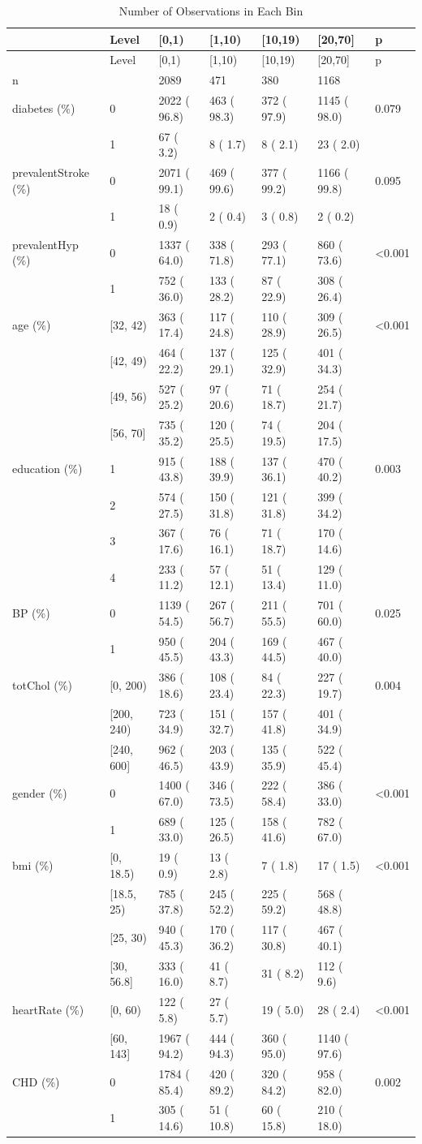 \documentclass[]{article}
\begin{document}
\begin{longtable}[]{@{}lllllll@{}}
\caption{Number of Observations in Each Bin}\tabularnewline
\toprule
& Level & {[}0,1) & {[}1,10) & {[}10,19) & {[}20,70{]} &
p\tabularnewline
\midrule
\endfirsthead
\toprule
& Level & {[}0,1) & {[}1,10) & {[}10,19) & {[}20,70{]} &
p\tabularnewline
\midrule
\endhead
n & & 2089 & 471 & 380 & 1168 &\tabularnewline
diabetes (\%) & 0 & 2022 ( 96.8) & 463 ( 98.3) & 372 ( 97.9) & 1145 (
98.0) & 0.079\tabularnewline
& 1 & 67 ( 3.2) & 8 ( 1.7) & 8 ( 2.1) & 23 ( 2.0) &\tabularnewline
prevalentStroke (\%) & 0 & 2071 ( 99.1) & 469 ( 99.6) & 377 ( 99.2) &
1166 ( 99.8) & 0.095\tabularnewline
& 1 & 18 ( 0.9) & 2 ( 0.4) & 3 ( 0.8) & 2 ( 0.2) &\tabularnewline
prevalentHyp (\%) & 0 & 1337 ( 64.0) & 338 ( 71.8) & 293 ( 77.1) & 860 (
73.6) & \textless{}0.001\tabularnewline
& 1 & 752 ( 36.0) & 133 ( 28.2) & 87 ( 22.9) & 308 ( 26.4)
&\tabularnewline
age (\%) & {[}32, 42) & 363 ( 17.4) & 117 ( 24.8) & 110 ( 28.9) & 309 (
26.5) & \textless{}0.001\tabularnewline
& {[}42, 49) & 464 ( 22.2) & 137 ( 29.1) & 125 ( 32.9) & 401 ( 34.3)
&\tabularnewline
& {[}49, 56) & 527 ( 25.2) & 97 ( 20.6) & 71 ( 18.7) & 254 ( 21.7)
&\tabularnewline
& {[}56, 70{]} & 735 ( 35.2) & 120 ( 25.5) & 74 ( 19.5) & 204 ( 17.5)
&\tabularnewline
education (\%) & 1 & 915 ( 43.8) & 188 ( 39.9) & 137 ( 36.1) & 470 (
40.2) & 0.003\tabularnewline
& 2 & 574 ( 27.5) & 150 ( 31.8) & 121 ( 31.8) & 399 ( 34.2)
&\tabularnewline
& 3 & 367 ( 17.6) & 76 ( 16.1) & 71 ( 18.7) & 170 ( 14.6)
&\tabularnewline
& 4 & 233 ( 11.2) & 57 ( 12.1) & 51 ( 13.4) & 129 ( 11.0)
&\tabularnewline
BP (\%) & 0 & 1139 ( 54.5) & 267 ( 56.7) & 211 ( 55.5) & 701 ( 60.0) &
0.025\tabularnewline
& 1 & 950 ( 45.5) & 204 ( 43.3) & 169 ( 44.5) & 467 ( 40.0)
&\tabularnewline
totChol (\%) & {[}0, 200) & 386 ( 18.6) & 108 ( 23.4) & 84 ( 22.3) & 227
( 19.7) & 0.004\tabularnewline
& {[}200, 240) & 723 ( 34.9) & 151 ( 32.7) & 157 ( 41.8) & 401 ( 34.9)
&\tabularnewline
& {[}240, 600{]} & 962 ( 46.5) & 203 ( 43.9) & 135 ( 35.9) & 522 ( 45.4)
&\tabularnewline
gender (\%) & 0 & 1400 ( 67.0) & 346 ( 73.5) & 222 ( 58.4) & 386 ( 33.0)
& \textless{}0.001\tabularnewline
& 1 & 689 ( 33.0) & 125 ( 26.5) & 158 ( 41.6) & 782 ( 67.0)
&\tabularnewline
bmi (\%) & {[}0, 18.5) & 19 ( 0.9) & 13 ( 2.8) & 7 ( 1.8) & 17 ( 1.5) &
\textless{}0.001\tabularnewline
& {[}18.5, 25) & 785 ( 37.8) & 245 ( 52.2) & 225 ( 59.2) & 568 ( 48.8)
&\tabularnewline
& {[}25, 30) & 940 ( 45.3) & 170 ( 36.2) & 117 ( 30.8) & 467 ( 40.1)
&\tabularnewline
& {[}30, 56.8{]} & 333 ( 16.0) & 41 ( 8.7) & 31 ( 8.2) & 112 ( 9.6)
&\tabularnewline
heartRate (\%) & {[}0, 60) & 122 ( 5.8) & 27 ( 5.7) & 19 ( 5.0) & 28 (
2.4) & \textless{}0.001\tabularnewline
& {[}60, 143{]} & 1967 ( 94.2) & 444 ( 94.3) & 360 ( 95.0) & 1140 (
97.6) &\tabularnewline
CHD (\%) & 0 & 1784 ( 85.4) & 420 ( 89.2) & 320 ( 84.2) & 958 ( 82.0) &
0.002\tabularnewline
& 1 & 305 ( 14.6) & 51 ( 10.8) & 60 ( 15.8) & 210 ( 18.0)
&\tabularnewline
\bottomrule
\end{longtable}
\end{document}
